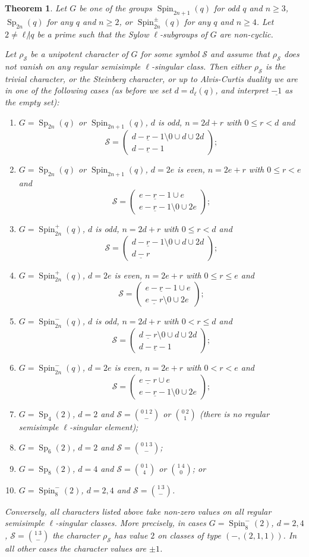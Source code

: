 \documentclass{ert-l}
\newcommand{\cS}{{\mathcal{S}}}
\newcommand{\Sp}{{\operatorname{Sp}}}
\newcommand{\Spin}{{\operatorname{Spin}}}
\newcommand{\ul}[1]{\underline{#1}}
\newcommand{\sy}[2]{\ensuremath{\left(\begin{array}{c}{#1}\\{#2}\end{array}\right)}}
\let\sm=\setminus
\let\sys=\binom
\newtheorem{thm}{Theorem}[section]
\theoremstyle{definition}
\theoremstyle{remark}
\begin{document}
\begin{thm}   \label{thm:unip}
 Let $G$ be one of the groups $\Spin_{2n+1}(q)$ for odd $q$ and $n \geq 3$,
 $\Sp_{2n}(q)$ for any $q$ and $n \geq 2$, or $\Spin^\pm_{2n}(q)$ for any $q$
 and $n \geq 4$. Let $2\ne\ell{\not|}q$ be a prime such that the Sylow
 $\ell$-subgroups of $G$ are non-cyclic.

 Let $\rho_\cS$ be a unipotent character of $G$ for some symbol $\cS$ and
 assume that $\rho_\cS$ does not vanish on any regular semisimple
 $\ell$-singular class. Then either $\rho_\cS$ is the trivial character, or
 the Steinberg character, or up to Alvis-Curtis duality we are in one of the
 following cases (as before we set $d = d_\ell(q)$, and interpret $\ul{-1}$ as
 the empty set):
 \begin{enumerate}[\rm(1)]
  \item $G=\Sp_{2n}(q)$ or $\Spin_{2n+1}(q)$, $d$ is odd, $n = 2d+r$ with
   $0\leq r < d$ and
   \[\cS = \sy{\ul{d-r-1}\sm 0 \cup d \cup 2d}{\ul{d-r-1}};\]
  \item $G=\Sp_{2n}(q)$ or $\Spin_{2n+1}(q)$, $d=2e$ is even, $n=2e+r$ with
   $0\leq r < e$ and
   \[\cS = \sy{\ul{e-r-1} \cup e}{\ul{e-r-1}\sm 0 \cup 2e};\]
  \item $G=\Spin_{2n}^+(q)$, $d$ is odd, $n = 2d+r$ with $0\leq r < d$ and
   \[\cS = \sy{\ul{d-r-1}\sm 0 \cup d \cup 2d}{\ul{d-r}};\]
  \item $G=\Spin_{2n}^+(q)$, $d=2e$ is even, $n=2e+r$ with $0\leq r \le e$ and
   \[\cS = \sy{\ul{e-r-1} \cup e}{\ul{e-r}\sm 0 \cup  2e};\]
  \item $G=\Spin_{2n}^-(q)$, $d$ is odd, $n = 2d+r$ with $0 < r \le d$ and
   \[\cS = \sy{\ul{d-r}\sm 0 \cup d \cup 2d}{\ul{d-r-1}};\]
  \item $G=\Spin_{2n}^-(q)$, $d=2e$ is even, $n=2e+r$ with $0 < r < e$ and
   \[\cS = \sy{\ul{e-r} \cup e}{\ul{e-r-1}\sm 0 \cup  2e};\]
  \item $G=\Sp_4(2)$, $d=2$ and $\cS =\sys{0\ 1\ 2}{-}$ or $\sys{0\ 2}{1}$
   (there is no regular semisimple $\ell$-singular element);
  \item $G=\Sp_6(2)$, $d=2$ and $\cS=\sys{0\ 1\ 3}{-}$;
  \item $G=\Sp_8(2)$, $d=4$ and $\cS=\sys{0\ 1}{4}$ or $\sys{1\ 4}{0}$; or
  \item $G=\Spin_8^-(2)$, $d=2,4$ and $\cS=\sys{1\ 3}{-}$.
 \end{enumerate}
 Conversely, all characters listed above take non-zero values on all regular
 semisimple $\ell$-singular classes. More precisely, in cases $G=\Spin_8^-(2)$,
 $d=2,4$, $\cS=\sys{1\ 3}{-}$ the character $\rho_\cS$ has value $2$ on classes
 of type $(-,(2,1,1))$. In all other cases the character values are $\pm 1$.
\end{thm}
\end{document}
